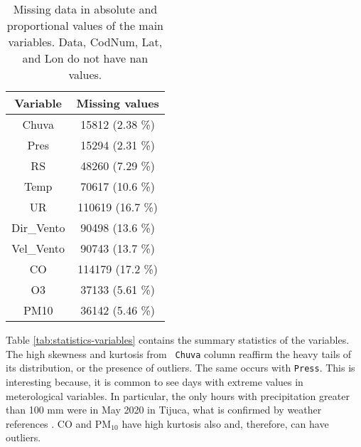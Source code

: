 \begin{table}
    \centering
    \begin{tabular}{|c|c|}
        \hline
        {\bf Variable} & {\bf Missing values} \\\hline
        Chuva     &   15812 (2.38 \%) \\\hline
        Pres      &   15294 (2.31 \%) \\\hline
        RS        &   48260 (7.29 \%) \\\hline
        Temp      &   70617 (10.6 \%) \\\hline
        UR        &  110619 (16.7 \%) \\\hline
        Dir\_Vento &   90498 (13.6 \%) \\\hline
        Vel\_Vento &   90743 (13.7 \%) \\\hline
        CO        &  114179 (17.2 \%) \\\hline
        O3        &   37133 (5.61 \%) \\\hline
        PM10      &   36142 (5.46 \%) \\\hline
    \end{tabular}
    \caption{Missing data in absolute and proportional values of the main variables. Data, CodNum, Lat, and Lon do not have nan values.}
    \label{tab:missing-values}    
\end{table}

Table \ref{tab:statistics-variables} contains the summary statistics of the variables. The high skewness and kurtosis from {\tt
Chuva} column reaffirm the heavy tails of its distribution, or the presence of
outliers. The same occurs with {\tt Press}. This is interesting because, it is common to see days with
extreme values in meterological variables. In particular, the only hours with
precipitation greater than 100 mm were in May 2020 in Tijuca, what is
confirmed by weather references \cite{climatempo}. CO and PM$_{10}$ have high
kurtosis also and, therefore, can have outliers. 

